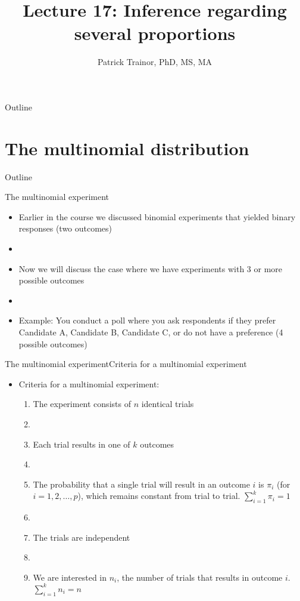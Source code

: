 \documentclass[xcolor=dvipsnames]{beamer}
\title[Lecture 17]{Lecture 17: Inference regarding several proportions}
\author[Patrick Trainor]{Patrick Trainor, PhD, MS, MA}
\institute[NMSU]{New Mexico State University}
\date{}
\begin{document}
\begin{frame}
\maketitle
\end{frame}

\begin{frame}{Outline}
\tableofcontents[hideallsubsections]
\end{frame}

\section{The multinomial distribution}
\begin{frame}{Outline}
\tableofcontents[currentsection,subsectionstyle=show/shaded/hide]
\end{frame}

\begin{frame}{The multinomial experiment}
	\begin{itemize}
		\item Earlier in the course we discussed binomial experiments that yielded binary responses (two outcomes) \pause
		\item[]
		\item Now we will discuss the case where we have experiments with 3 or more possible outcomes \pause
		\item[]
		\item Example: You conduct a poll where you ask respondents if they prefer Candidate A, Candidate B, Candidate C, or do not have a preference (4 possible outcomes)
	\end{itemize}
\end{frame}

\begin{frame}{The multinomial experiment}{Criteria for a multinomial experiment}
	\begin{itemize}
		\item Criteria for a multinomial experiment: \pause
		\begin{enumerate}
			\item The experiment consists of $n$ identical trials \pause
			\item[]
			\item Each trial results in one of $k$ outcomes \pause
			\item[]
			\item The probability that a single trial will result in an outcome $i$ is $\pi_i$ (for $i=1, 2, \hdots, p$), which remains constant from trial to trial. $\sum_{i=1}^k \pi_i = 1$ \pause
			\item[]
			\item The trials are independent \pause
			\item[]
			\item We are interested in $n_i$, the number of trials that results in outcome $i$. $\sum_{i=1}^k n_i = n$ \pause
		\end{enumerate}
	\end{itemize}
\end{frame}
\end{document}
